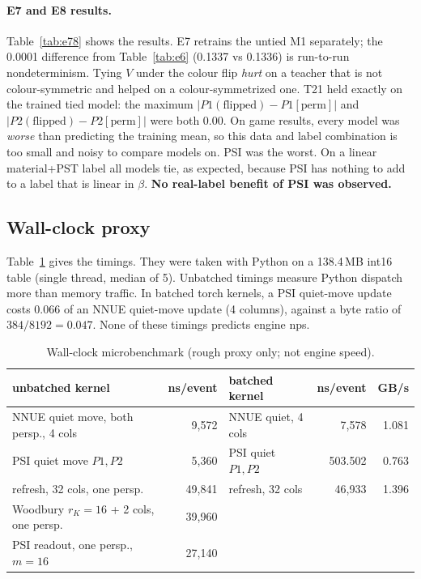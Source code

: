 \paragraph{E7 and E8 results.}
Table~\ref{tab:e78} shows the results.
E7 retrains the untied M1 separately; the 0.0001 difference from Table~\ref{tab:e6} (0.1337 vs 0.1336) is run-to-run nondeterminism.
Tying $V$ under the colour flip \emph{hurt} on a teacher that is not colour-symmetric and helped on a colour-symmetrized one.
T21 held exactly on the trained tied model: the maximum $|P1(\text{flipped})-P1[\text{perm}]|$ and $|P2(\text{flipped})-P2[\text{perm}]|$ were both $0.00$.
On game results, every model was \emph{worse} than predicting the training mean, so this data and label combination is too small and noisy to compare models on. PSI was the worst.
On a linear material+PST label all models tie, as expected, because PSI has nothing to add to a label that is linear in $\beta$.
\textbf{No real-label benefit of PSI was observed.}

\subsection{Wall-clock proxy}

Table~\ref{tab:bench} gives the timings.
They were taken with Python on a 138.4\,MB int16 table (single thread, median of 5).
Unbatched timings measure Python dispatch more than memory traffic.
In batched torch kernels, a PSI quiet-move update costs 0.066 of an NNUE quiet-move update (4 columns), against a byte ratio of $384/8192=0.047$.
None of these timings predicts engine nps.

\begin{table}[htbp]
\centering\small
\caption{Wall-clock microbenchmark (rough proxy only; not engine speed).}\label{tab:bench}
\begin{tabular}{@{}lr@{\qquad}lrr@{}}
\toprule
unbatched kernel & ns/event & batched kernel & ns/event & GB/s\\
\midrule
NNUE quiet move, both persp., 4 cols & 9,572 & NNUE quiet, 4 cols & 7,578 & 1.081\\
PSI quiet move $P1,P2$ & 5,360 & PSI quiet $P1,P2$ & 503.502 & 0.763\\
refresh, 32 cols, one persp. & 49,841 & refresh, 32 cols & 46,933 & 1.396\\
Woodbury $r_K=16$ + 2 cols, one persp. & 39,960 & & &\\
PSI readout, one persp., $m=16$ & 27,140 & & &\\
\bottomrule
\end{tabular}
\end{table}

